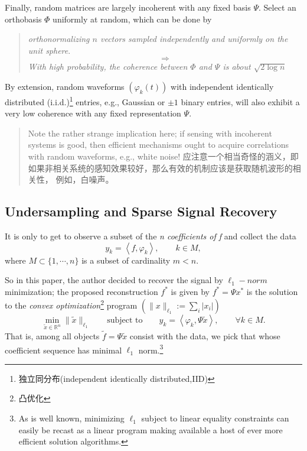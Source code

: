 Finally, random matrices are largely incoherent with any fixed basis $\Psi$. Select an orthobasis $\Phi$ uniformly at random, which can be done by
\begin{quote}
	\emph{orthonormalizing $n$ vectors sampled independently and uniformly on the unit sphere}.
	\[\Longrightarrow\]
	\emph{With high probability, the coherence between $\varPhi$ and $\varPsi$ is about $\sqrt{2\log n}$}
\end{quote}
By extension, random waveforms $(\varphi_k(t))$ with independent identically distributed (i.i.d.)\label{i.i.d}\footnote{独立同分布(independent identically distributed,IID)} entries, e.g., Gaussian or $\pm1$ binary entries, will also exhibit a very low coherence
with any fixed representation $\Psi$.
\begin{quote}
	Note the rather strange implication here; if sensing with incoherent systems is good, then efficient mechanisms ought to acquire correlations with random waveforms, e.g., white noise!
	应注意一个相当奇怪的涵义，即如果非相关系统的感知效果较好，那么有效的机制应该是获取随机波形的相关性， 例如，白噪声。
\end{quote}

\subsection{Undersampling and Sparse Signal Recovery}
It is only to get to observe a subset of the \emph{n coefficients of f} and collect the data
\begin{equation}
\label{eq4}
y_k=\left<f,\varphi_k\right>, \qquad k \in M,
\end{equation}
where $M \subset \{1,\cdots,n\}$ is a subset of cardinality $m < n$.

So in this paper\cite{Candes2008}, the author decided to recover the signal by $\ell_1-norm$ minimization; the proposed reconstruction $f^*$ is given by $f^*=\Psi x^*$ is the solution to the \emph{convex optimization}\footnote{凸优化} program $(\|x\|_{\ell_1}:=\sum_i\left|x_i\right|)$
\begin{equation}
\label{eq5}
\min_{\tilde{x}\in\mathbb{R}^n}\|\tilde{x}\|_{\ell_1} \qquad \text{subject to} \qquad y_k=\left<\varphi_k,\Psi\tilde{x}\right>, \qquad \forall k \in M.
\end{equation}
That is, among all objects $\tilde{f}=\Psi\tilde{x}$ consist with the data, we pick that whose coefficient sequence has minimal $\ell_1$ norm.\footnote{As is well known, minimizing $\ell_1$ subject to linear equality constraints can easily be recast as a linear program making available a host of ever more efficient solution algorithms.}

